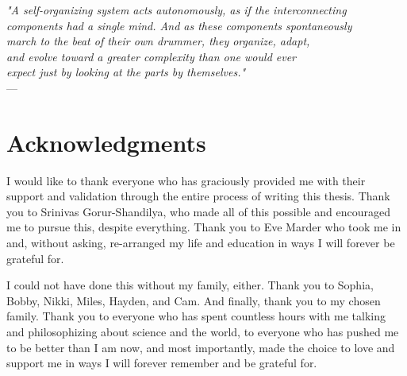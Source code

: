 
\begin{flushright}{\slshape
    "A self-organizing system acts autonomously, as if the interconnecting  \\
    components had a single mind. And as these components spontaneously\\
    march to the beat of their own drummer, they organize, adapt,\\
    and evolve toward a greater complexity than one would ever\\
    expect just by looking at the parts by themselves."} \\ \medskip
    ---  \citep{samuels_defense_2013}
\end{flushright}

\bigskip

\begingroup
\let\clearpage\relax
\let\cleardoublepage\relax
\let\cleardoublepage\relax
\chapter*{Acknowledgments}
   I would like to thank everyone who has graciously provided me with their support and validation through the entire process of writing this thesis. Thank you to Srinivas Gorur-Shandilya, who made all of this possible and encouraged me to pursue this, despite everything. Thank you to Eve Marder who took me in and, without asking, re-arranged my life and education in ways I will forever be grateful for.
   
   I could not have done this without my family, either. Thank you to Sophia, Bobby, Nikki, Miles, Hayden, and Cam. And finally, thank you to my chosen family. Thank you to everyone who has spent countless hours with me talking and philosophizing about science and the world, to everyone who has pushed me to be better than I am now, and most importantly, made the choice to love and support me in ways I will forever remember and be grateful for.

\bigskip



\endgroup
